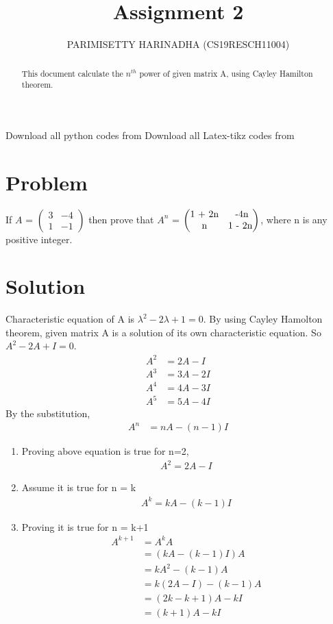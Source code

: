 \documentclass[journal,12pt,twocolumn]{IEEEtran}
\title{Assignment 2}
\author{PARIMISETTY HARINADHA (CS19RESCH11004)}
\newcommand{\myvec}[1]{\ensuremath{\begin{pmatrix}#1\end{pmatrix}}}
\begin{document}
\maketitle
\newpage
\begin{abstract}
This document calculate the $n^{th}$ power of given matrix A, using Cayley Hamilton theorem.
\end{abstract}
Download all python codes from 
Download all Latex-tikz codes from 
\section{Problem}
If $A$ = \myvec{ 3 & -4 \\ 1 & -1 } then prove that $A^n$ = \myvec{ $1 + 2n$ & $ -4n$ \\ $n$ & $1 - 2n$ }, where n is any positive integer.
\section{Solution}
Characteristic equation of A is $\lambda^2 - 2\lambda + 1 = 0$.
By using Cayley Hamolton theorem, given matrix A is a solution of its own characteristic equation. So $A^2 - 2A + I = 0$.
\begin {align}
	A^2 &= 2A - I  \\
	A^3 &= 3A - 2I \\
        A^4 &= 4A - 3I \\
	A^5 &= 5A - 4I
\end{align}
 By the substitution, 
\begin {align}
	A^n &= nA - (n-1)I 
\end{align}
\begin{enumerate}
\item Proving above equation is true for n=2,
\begin {align}
A^2 = 2A -I
\end {align}

\item Assume it is true for n = k
 \begin {align}
A^k = kA -(k-1)I
\end {align}

\item Proving it is true for n = k+1
 \begin {align}
A^{k+1} &= A^k A \\
        &= (kA -(k-1)I)A \\  
        &= kA^2 - (k-1)A \\
        &= k(2A -I) - (k-1)A \\
        &= (2k-k+1)A - kI \\
        &= (k+1)A - kI 
\end {align}
\end{enumerate}
 
\end{document}
